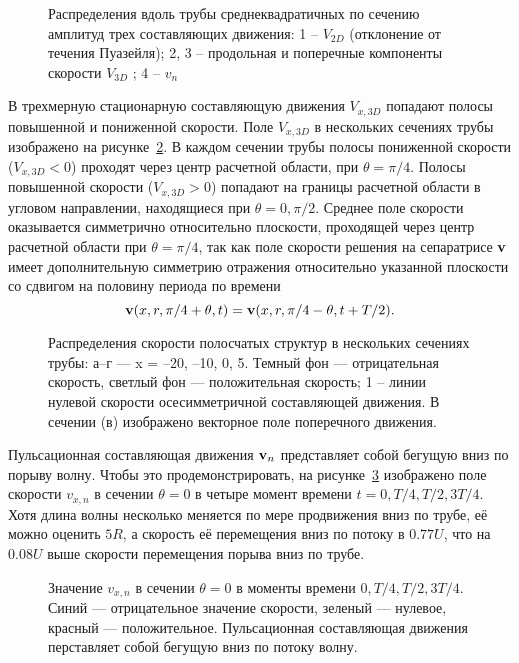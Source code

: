 \begin{figure}[h]
\caption{Распределения вдоль трубы среднеквадратичных по сечению амплитуд трех
составляющих движения: 1 – $V_{2D}$ (отклонение от течения Пуазейля); 2, 3 – продольная и поперечные компоненты скорости $V_{3D}$ ; 4 – $v_{n}$}
\label{amp_pic}
\end{figure}


В трехмерную стационарную составляющую движения $V_{x,3D}$ попадают полосы повышенной и пониженной скорости. Поле $V_{x,3D}$ в нескольких сечениях трубы изображено на рисунке~\ref{V3D_cs_pic}. В каждом сечении трубы полосы пониженной скорости ($V_{x,3D} < 0$) проходят через центр расчетной области, при $\theta = \pi/4$. Полосы повышенной скорости ($V_{x,3D} > 0$) попадают на границы расчетной области в угловом направлении, находящиеся при $\theta = 0, \pi/2$. Среднее поле скорости оказывается симметрично относительно плоскости, проходящей через центр расчетной области при $\theta = \pi/4$, так как поле скорости решения на сепаратрисе $\mathbf{v}$ имеет дополнительную симметрию отражения относительно указанной плоскости со сдвигом на половину периода по времени
\begin{equation}
\mathbf{v}(x, r, \pi/4 + \theta, t) = \mathbf{v}(x, r, \pi/4 - \theta, t + T/2). 
\end{equation} 


\begin{figure}[h]
\caption{Распределения скорости полосчатых структур в нескольких сечениях трубы:
а–г --- x = –20, –10, 0, 5. Темный фон --- отрицательная скорость, светлый фон --- положительная скорость; 1 – линии нулевой скорости осесимметричной составляющей движения. В сечении (в) изображено векторное поле поперечного движения.}
\label{V3D_cs_pic}
\end{figure}

Пульсационная составляющая движения $\mathbf{v}_n$ представляет собой бегущую вниз по порыву волну. Чтобы это продемонстрировать, на рисунке~\ref{puls_ls_pic} изображено поле скорости $v_{x,n}$ в сечении $\theta = 0$ в четыре момент времени $t=0, T/4, T/2, 3T/4$. Хотя длина волны несколько меняется по мере продвижения вниз по трубе, её можно оценить $5R$, а скорость её перемещения вниз по потоку в $0.77U$, что на $0.08U$ выше скорости перемещения порыва вниз по трубе.  


\begin{figure}[h]
\caption{Значение $v_{x,n}$ в сечении $\theta=0$ в моменты времени $0, T/4, T/2, 3T/4$. Синий --- отрицательное значение скорости, зеленый --- нулевое, красный --- положительное. Пульсационная составляющая движения перставляет собой бегущую вниз по потоку волну. }
\label{puls_ls_pic}
\end{figure}


